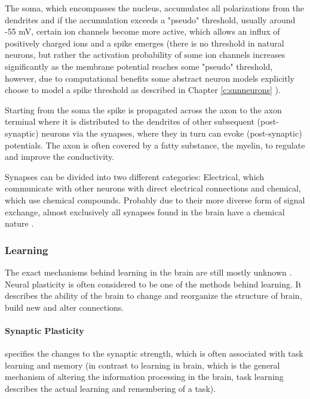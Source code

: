 The soma, which encompasses the nucleus, accumulates all polarizations from the dendrites and if the accumulation exceeds a "pseudo" threshold, usually around -55 mV, certain ion channels become more active, which allows an influx of positively charged ions and a spike emerges (there is no threshold in natural neurons, but rather the activation probability of some ion channels increases significantly as the membrane potential reaches some "pseudo" threshold, however, due to computational benefits some abstract neuron models explicitly choose to model a spike threshold as described in Chapter \ref{c:snnneurons} ).

Starting from the soma the spike is propagated across the axon to the axon terminal where it is distributed to the dendrites of other subsequent (post-synaptic) neurons via the synapses, where they in turn can evoke (post-synaptic) potentials.
The axon is often covered by a fatty substance, the myelin, to regulate and improve the conductivity.

Synapses can be divided into two different categories: Electrical, which communicate with other neurons with direct electrical connections and chemical, which use chemical compounds.
Probably due to their more diverse form of signal exchange, almost exclusively all synapses found in the brain have a chemical nature \cite{Byrne1997}.

\subsubsection{Learning} \label{c:natlearning}

The exact mechanisms behind learning in the brain are still mostly unknown \cite{gerstner2014neuronal}\cite{Byrne1997}\cite{Markram2012}.
Neural plasticity is often considered to be one of the methods behind learning. 
It describes the ability of the brain to change and reorganize the structure of brain, build new and alter connections.  

\paragraph{Synaptic Plasticity} \label{c:synplasiticity}
specifies the changes to the synaptic strength, which is often associated with task learning and memory (in contrast to learning in brain, which is the general mechanism of altering the information processing in the brain, task learning describes the actual learning and remembering of a task). 

